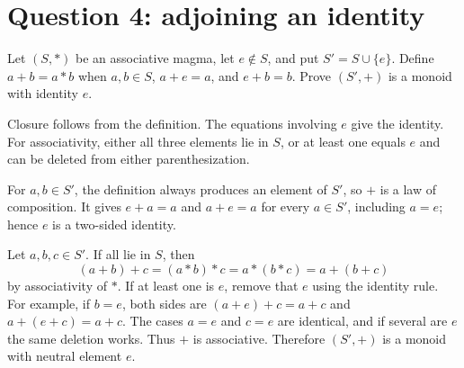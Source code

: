 \documentclass[11pt,openany]{book}
\begin{document}
\section{Question 4: adjoining an identity}
\begin{questionbox}
Let $(S,*)$ be an associative magma, let $e\notin S$, and put $S'=S\cup\{e\}$. Define $a+b=a*b$ when $a,b\in S$, $a+e=a$, and $e+b=b$. Prove $(S',+)$ is a monoid with identity $e$.
\end{questionbox}
\begin{approachbox}
Closure follows from the definition. The equations involving $e$ give the identity. For associativity, either all three elements lie in $S$, or at least one equals $e$ and can be deleted from either parenthesization.
\end{approachbox}
\begin{solutionbox}
For $a,b\in S'$, the definition always produces an element of $S'$, so $+$ is a law of composition. It gives $e+a=a$ and $a+e=a$ for every $a\in S'$, including $a=e$; hence $e$ is a two-sided identity.

Let $a,b,c\in S'$. If all lie in $S$, then
\[
(a+b)+c=(a*b)*c=a*(b*c)=a+(b+c)
\]
by associativity of $*$. If at least one is $e$, remove that $e$ using the identity rule. For example, if $b=e$, both sides are
$(a+e)+c=a+c$ and $a+(e+c)=a+c$. The cases $a=e$ and $c=e$ are identical, and if several are $e$ the same deletion works. Thus $+$ is associative. Therefore $(S',+)$ is a monoid with neutral element $e$.
\end{solutionbox}
\end{document}
